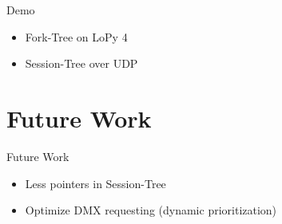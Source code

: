 \documentclass[aspectratio=169]{beamer}
\begin{document}
\begin{frame}[c]{Demo}
\begin{itemize}
\item Fork-Tree on LoPy 4
\item Session-Tree over UDP
\end{itemize}

\end{frame}

\section{Future Work}
\begin{frame}[c]{Future Work}
\begin{itemize}
\item Less pointers in Session-Tree
\item Optimize DMX requesting (dynamic prioritization)
\end{itemize}
\end{frame}
\end{document}

